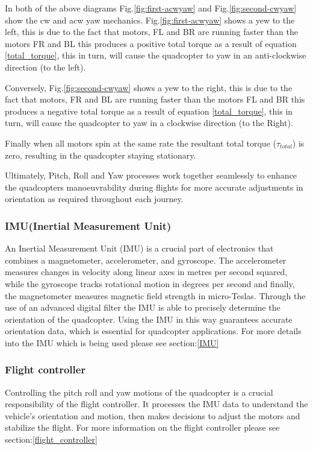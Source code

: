 \documentclass{article}
\begin{document}
In both of the above diagrams Fig.\ref{fig:first-acwyaw} and
Fig.\ref{fig:second-cwyaw} show the cw and acw yaw mechanics.
Fig.\ref{fig:first-acwyaw} shows a yew to the left, this is due to the fact that
motors, FL and BR are running faster than the motors FR and BL this produces a
positive total torque as a result of equation \ref{total_torque}, this in turn,
will cause the quadcopter to yaw in an anti-clockwise direction (to the left).

Conversely, Fig.\ref{fig:second-cwyaw}  shows a yew to the right, this is due to
the fact that motors, FR and BL are running faster than the motors FL and BR
this produces a negative total torque as a result of equation
\ref{total_torque}, this in turn,  will cause the quadcopter to yaw in a
clockwise direction (to the Right).

Finally when all motors spin at the same rate the resultant total torque
(\(\tau_{total}\)) is zero, resulting in the quadcopter staying stationary.


Ultimately, Pitch, Roll and Yaw processes work together seamlessly to enhance
the quadcopters manoeuvrability during flights for more accurate adjustments in
orientation as required throughout each journey.

\subsubsection{IMU(Inertial Measurement Unit)}
An Inertial Measurement Unit (IMU) is a crucial part of electronics that
combines a magnetometer, accelerometer, and gyroscope. The accelerometer
measures changes in velocity along linear axes in metres per second squared,
while the gyroscope tracks rotational motion in degrees per second and finally,
the magnetometer measures magnetic field strength in micro-Teslas. Through the
use of an advanced digital filter the IMU is able to precisely determine the
orientation of the quadcopter. Using the IMU in this way guarantees accurate
orientation data, which is essential for quadcopter applications. For more
details into the IMU which is being used please see section:\ref{IMU}

\subsubsection{Flight controller}
Controlling the pitch roll and yaw motions of the quadcopter is a crucial
responsibility of the flight controller. It processes the IMU data to understand
the vehicle's orientation and motion, then makes decisions to adjust the motors
and stabilize the flight. For more information on the flight controller please
see section:\ref{flight_controller}
\end{document}
